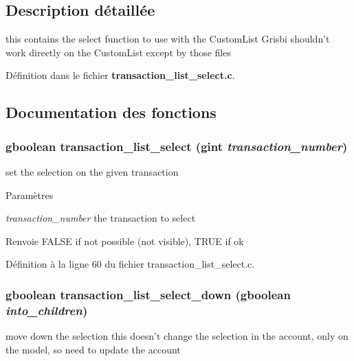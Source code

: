 \subsection{Description détaillée}
this contains the select function to use with the CustomList Grisbi shouldn't work directly on the CustomList except by those files 

Définition dans le fichier {\bf transaction\_\-list\_\-select.c}.



\subsection{Documentation des fonctions}
\subsubsection[{transaction\_\-list\_\-select}]{\setlength{\rightskip}{0pt plus 5cm}gboolean transaction\_\-list\_\-select (gint {\em transaction\_\-number})}\label{transaction__list__select_8c_a85f38a439156b883335de73220dca237}
set the selection on the given transaction


\begin{DoxyParams}{Paramètres}
\item[{\em transaction\_\-number}]the transaction to select\end{DoxyParams}
\begin{DoxyReturn}{Renvoie}
FALSE if not possible (not visible), TRUE if ok 
\end{DoxyReturn}


Définition à la ligne 60 du fichier transaction\_\-list\_\-select.c.

\subsubsection[{transaction\_\-list\_\-select\_\-down}]{\setlength{\rightskip}{0pt plus 5cm}gboolean transaction\_\-list\_\-select\_\-down (gboolean {\em into\_\-children})}\label{transaction__list__select_8c_aad826f93d59044effba7ca1c31eccabb}
move down the selection this doesn't change the selection in the account, only on the model, so need to update the account


